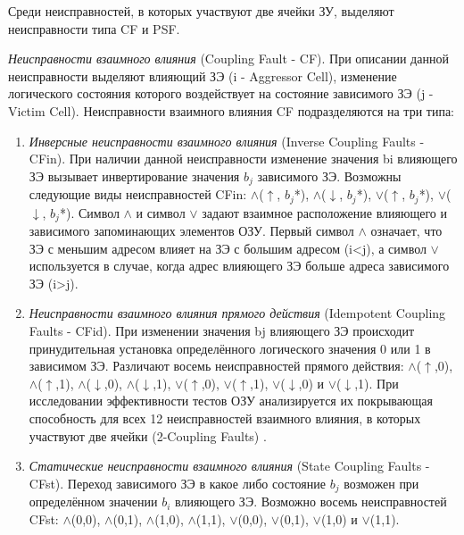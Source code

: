 Среди неисправностей, в которых участвуют две ячейки ЗУ, выделяют неисправности типа CF и PSF.

\textit{Неисправности взаимного влияния} (Coupling Fault - CF). При описании данной неисправности выделяют влияющий ЗЭ (i - Aggressor Cell), изменение логического состояния которого воздействует на состояние зависимого ЗЭ (j - Victim Cell). Неисправности взаимного влияния CF подразделяются на три типа:
\begin{enumerate}
\item \textit{Инверсные неисправности взаимного влияния} (Inverse Coupling Faults - CFin). При наличии данной неисправности изменение значения bi влияющего ЗЭ вызывает инвертирование значения $b_j$ зависимого ЗЭ. Возможны следующие виды неисправностей CFin: $\wedge$($\uparrow$, $b_j$*), $\wedge$($\downarrow$, $b_j$*), $\vee$($\uparrow$, $b_j$*), $\vee$($\downarrow$, $b_j$*). Символ $\wedge$ и символ $\vee$ задают взаимное расположение влияющего и зависимого запоминающих элементов ОЗУ. Первый символ $\wedge$ означает, что ЗЭ с меньшим адресом влияет на ЗЭ с большим адресом (i<j), а символ $\vee$ используется в случае, когда адрес влияющего ЗЭ больше адреса зависимого ЗЭ (i>j).
\item \textit{Неисправности взаимного влияния прямого действия} (Idempotent Coupling Faults - CFid). При изменении значения bj влияющего ЗЭ происходит принудительная установка определённого логического значения 0 или 1 в зависимом ЗЭ. Различают восемь неисправностей прямого действия: $\wedge$($\uparrow$,0), $\wedge$($\uparrow$,1), $\wedge$($\downarrow$,0), $\wedge$($\downarrow$,1), $\vee$($\uparrow$,0), $\vee$($\uparrow$,1), $\vee$($\downarrow$,0) и $\vee$($\downarrow$,1). При исследовании эффективности тестов ОЗУ анализируется их покрывающая способность для всех 12 неисправностей взаимного влияния, в которых участвуют две ячейки (2-Coupling Faults) \cite{faults}.
\item \textit{Статические неисправности взаимного влияния} (State Coupling Faults -CFst). Переход зависимого ЗЭ в какое либо состояние $b_j$ возможен при определённом значении $b_i$ влияющего ЗЭ. Возможно восемь неисправностей CFst: $\wedge$(0,0), $\wedge$(0,1), $\wedge$(1,0), $\wedge$(1,1), $\vee$(0,0), $\vee$(0,1), $\vee$(1,0) и $\vee$(1,1).
\end{enumerate}

